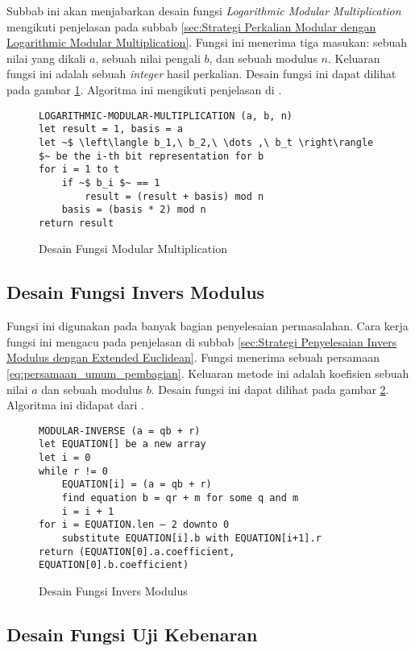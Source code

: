Subbab ini akan menjabarkan desain fungsi \textit{Logarithmic Modular Multiplication} mengikuti penjelasan pada subbab \ref{sec:Strategi Perkalian Modular dengan Logarithmic Modular Multiplication}. Fungsi ini menerima tiga masukan: sebuah nilai yang dikali $ a $, sebuah nilai pengali $ b $, dan sebuah modulus $ n $. Keluaran fungsi ini adalah sebuah \textit{integer} hasil perkalian. Desain fungsi ini dapat dilihat pada gambar \ref{psdo:modmul}. Algoritma ini mengikuti penjelasan di \cite{geeks_modular_multiplication}.
\begin{figure}[h!]
\begin{lstlisting}[firstnumber=0]
LOGARITHMIC-MODULAR-MULTIPLICATION (a, b, n)
let result = 1, basis = a
let ~$ \left\langle b_1,\ b_2,\ \dots ,\ b_t \right\rangle $~ be the i-th bit representation for b
for i = 1 to t
	if ~$ b_i $~ == 1
		result = (result + basis) mod n
	basis = (basis * 2) mod n
return result
\end{lstlisting}
\caption{Desain Fungsi Modular Multiplication}
\label{psdo:modmul}
\end{figure}

\subsection{Desain Fungsi Invers Modulus}

Fungsi ini digunakan pada banyak bagian penyelesaian permasalahan. Cara kerja fungsi ini mengacu pada penjelasan di subbab \ref{sec:Strategi Penyelesaian Invers Modulus dengan Extended Euclidean}. Fungsi menerima sebuah persamaan \ref{eq:persamaan_umum_pembagian}. Keluaran metode ini adalah koefisien sebuah nilai $ a $ dan sebuah modulus $ b $. Desain fungsi ini dapat dilihat pada gambar \ref{psdo:modinv}. Algoritma ini didapat dari \cite{hac_math}.
\begin{figure}[h!]
\begin{lstlisting}[firstnumber=0]
MODULAR-INVERSE (a = qb + r)
let EQUATION[] be a new array
let i = 0
while r != 0
	EQUATION[i] = (a = qb + r)
	find equation b = qr + m for some q and m
	i = i + 1
for i = EQUATION.len – 2 downto 0
	substitute EQUATION[i].b with EQUATION[i+1].r
return (EQUATION[0].a.coefficient, EQUATION[0].b.coefficient)
\end{lstlisting}
\caption{Desain Fungsi Invers Modulus}
\label{psdo:modinv}
\end{figure}

\subsection{Desain Fungsi Uji Kebenaran}

